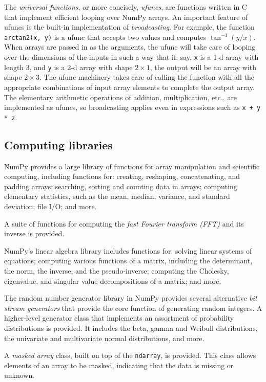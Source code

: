 \documentclass[fleqn,10pt]{wlscirep}
\newcommand{\code}[1]{\texttt{#1}}
\begin{document}
The \emph{universal functions}, or more concisely, \emph{ufuncs},
are functions written in C that implement efficient looping over
NumPy arrays. An important feature of ufuncs is the built-in
implementation of \emph{broadcasting}.  For example, the function
\code{arctan2(x, y)} is a ufunc that accepts two values and computes
$\tan^{-1}(y/x)$.  When arrays are passed in as the arguments,
the ufunc will take care of looping over the dimensions of the inputs
in such a way that if, say, \code{x} is a 1-d array with length 3, and
\code{y} is a 2-d array with shape $2 \times 1$, the output will be
an array with shape $2 \times 3$.  The ufunc machinery takes care
of calling the function with all the appropriate combinations of
input array elements to complete the output array.
The elementary arithmetic operations of addition, multiplication, etc.,
are implemented as ufuncs, so broadcasting applies even in expressions
such as \code{x + y * z}.

\subsection*{Computing libraries}

NumPy provides a large library of functions for array manipulation
and scientific computing, including functions for: creating, reshaping,
concatenating, and padding arrays; searching, sorting and counting data
in arrays; computing elementary statistics, such as the mean, median,
variance, and standard deviation; file I/O; and more.

A suite of functions for computing the \emph{fast Fourier transform (FFT)}
and its inverse is provided.

NumPy's linear algebra library includes functions for: solving linear
systems of equations; computing various functions of a matrix, including
the determinant, the norm, the inverse, and the pseudo-inverse;
computing the Cholesky, eigenvalue, and singular value decompositions of a matrix;
and more.

The random number generator library in NumPy provides several alternative
\emph{bit stream generators} that provide the core function of generating
random integers.
A higher-level generator class that implements an assortment of
probability distributions is provided. It includes the beta, gamma
and Weibull distributions, the univariate and multivariate normal
distributions, and more.

A \emph{masked array} class, built on top of the \code{ndarray}, is
provided.  This class allows elements of an array to be masked,
indicating that the data is missing or unknown.
\end{document}
